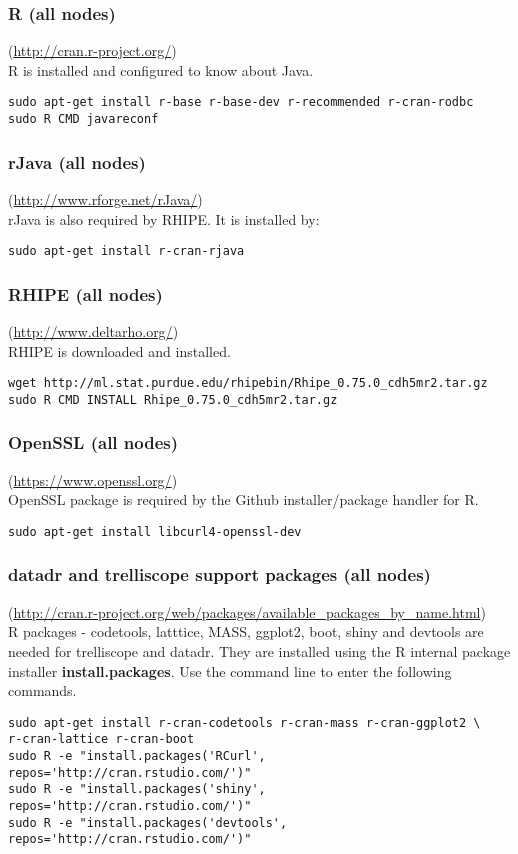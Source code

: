 \subsubsection{R (all nodes)} (\url{http://cran.r-project.org/})\\
R is installed and configured to know about Java.
\begin{verbatim}
sudo apt-get install r-base r-base-dev r-recommended r-cran-rodbc
sudo R CMD javareconf
\end{verbatim}

\subsubsection{rJava (all nodes)}(\url{http://www.rforge.net/rJava/})\\
rJava is also required by RHIPE.  It is installed by:

\begin{verbatim}
sudo apt-get install r-cran-rjava
\end{verbatim}

\subsubsection{RHIPE (all nodes)}(\url{http://www.deltarho.org/})\\
RHIPE is downloaded and installed.
\begin{verbatim}
wget http://ml.stat.purdue.edu/rhipebin/Rhipe_0.75.0_cdh5mr2.tar.gz
sudo R CMD INSTALL Rhipe_0.75.0_cdh5mr2.tar.gz
\end{verbatim}

\subsubsection{OpenSSL (all nodes)}(\url{https://www.openssl.org/})\\
OpenSSL package is required by the Github installer/package handler for R.
\begin{verbatim}
sudo apt-get install libcurl4-openssl-dev
\end{verbatim}

\subsubsection{datadr and trelliscope support packages (all nodes)}(\url{http://cran.r-project.org/web/packages/available\_packages\_by\_name.html})\\
R packages - codetools, latttice, MASS, ggplot2, boot, shiny and devtools are needed for trelliscope and datadr. They are installed using the R internal package installer \textbf{install.packages}. Use the command line to enter the following commands.
\begin{verbatim}
sudo apt-get install r-cran-codetools r-cran-mass r-cran-ggplot2 \
r-cran-lattice r-cran-boot
sudo R -e "install.packages('RCurl', repos='http://cran.rstudio.com/')"
sudo R -e "install.packages('shiny', repos='http://cran.rstudio.com/')"
sudo R -e "install.packages('devtools', repos='http://cran.rstudio.com/')"
\end{verbatim}

